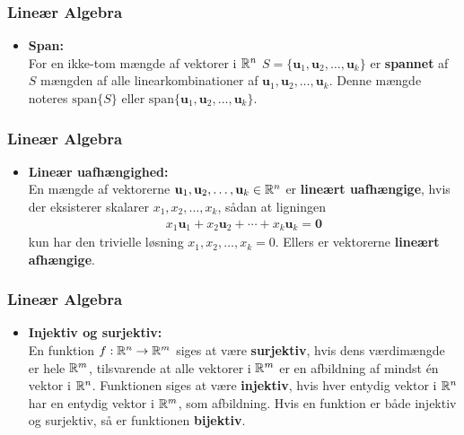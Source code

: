 \begin{frame}
\frametitle{Lineær Algebra}
\begin{itemize}
\item \textbf{Span: } \\ 
For en ikke-tom mængde af vektorer i $\mathbb{R}^n$ $S = \{\mathbf{u}_1, \mathbf{u}_2 , \ldots , \mathbf{u}_k \}$ er \textbf{spannet} af $S$ mængden af alle linearkombinationer af $\mathbf{u}_1, \mathbf{u}_2 , \ldots , \mathbf{u}_k$. 
Denne mængde noteres $\text{span} \{ S \}$ eller $\text{span}\{ \mathbf{u}_1, \mathbf{u}_2 , \ldots , \mathbf{u}_k \}$.
\begin{figure}[h!]
%
%
\label{span_eks}
\end{figure}
\end{itemize}
\end{frame}
\begin{frame}
\frametitle{Lineær Algebra}
\begin{itemize}
\item \textbf{Lineær uafhængighed: } \\ 
En mængde af vektorerne $\mathbf{u}_1, \mathbf{u}_2, \ldots , \mathbf{u}_k \in \mathbb{R}^n$ er \textbf{lineært uafhængige}, hvis der eksisterer skalarer $x_1, x_2, \ldots , x_k$, sådan at ligningen 
\begin{align*}
x_1\mathbf{u}_1 + x_2\mathbf{u}_2 + \cdots + x_k \mathbf{u}_k = \mathbf{0}
\end{align*}
kun har den trivielle løsning $x_1, x_2, \ldots, x_k = 0$.
Ellers er vektorerne \textbf{lineært afhængige}.
\end{itemize}
\end{frame}
\begin{frame}
\frametitle{Lineær Algebra}
\begin{itemize}
\item \textbf{Injektiv og surjektiv: } \\ 
En funktion $f:\mathbb{R}^n \rightarrow \mathbb{R}^m$ siges at være \textbf{surjektiv}, hvis dens værdimængde er hele $\mathbb{R}^m$, tilsvarende at alle vektorer i $\mathbb{R}^m$ er en afbildning af mindst én vektor i $\mathbb{R}^n$.
Funktionen siges at være \textbf{injektiv}, hvis hver entydig vektor i $\mathbb{R}^n$ har en entydig vektor i $\mathbb{R}^m$, som afbildning.
Hvis en funktion er både injektiv og surjektiv, så er funktionen \textbf{bijektiv}.
\end{itemize}
\end{frame}
